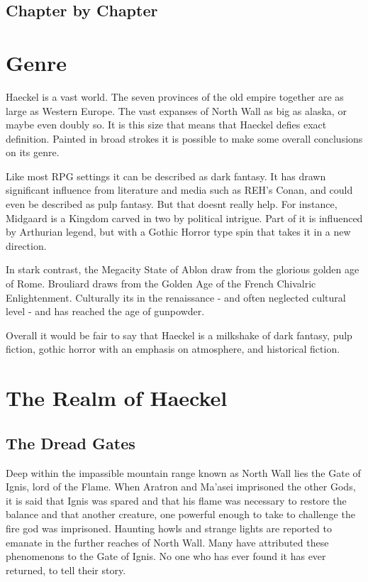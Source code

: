 \begin{multicols}{2}
\subsection{Chapter by Chapter} 

\section{Genre}

Haeckel is a vast world. The seven provinces of the old empire together are as large as Western Europe. The vast expanses of North Wall as big as alaska, or maybe even doubly so. It is this size that means that Haeckel defies exact definition. Painted in broad strokes it is possible to make some overall conclusions on its genre. 

Like most RPG settings it can be described as dark fantasy. It has drawn significant influence from literature and media such as REH's Conan, and could even be described as pulp fantasy. But that doesnt really help. For instance, Midgaard is a Kingdom carved in two by political intrigue. Part of it is influenced by Arthurian legend, but with a Gothic Horror type spin that takes it in a new direction. 

In stark contrast, the Megacity State of Ablon draw from the glorious golden age of Rome. Brouliard draws from the Golden Age of the French Chivalric Enlightenment. Culturally its in the renaissance - and often neglected cultural level - and has reached the age of gunpowder.  

Overall it would be fair to say that Haeckel is a milkshake of dark fantasy, pulp fiction, gothic horror with an emphasis on atmosphere, and historical fiction.

\section{The Realm of Haeckel}

\subsection{The Dread Gates} Deep within the impassible mountain range known as North Wall lies the Gate of Ignis, lord of the Flame. When Aratron and Ma’asei imprisoned the other Gods, it is said that Ignis was spared and that his flame was necessary to restore the balance and that another creature, one powerful enough to take to challenge the fire god was imprisoned. Haunting howls and strange lights are reported to emanate in the further reaches of North Wall. Many have attributed these phenomenons to the Gate of Ignis. No one who has ever found it has ever returned, to tell their story.


\end{multicols}
